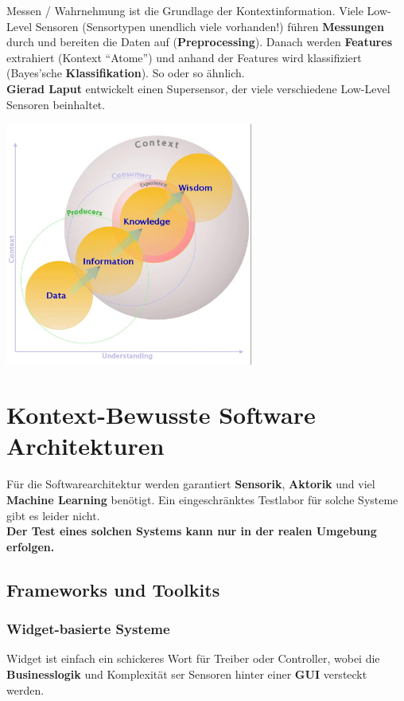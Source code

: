 \documentclass[a4paper]{article}
\begin{document}
Messen / Wahrnehmung ist die Grundlage der Kontextinformation. Viele Low-Level Sensoren (Sensortypen unendlich viele vorhanden!) führen \textbf{Messungen} durch und bereiten die Daten auf (\textbf{Preprocessing}). Danach werden \textbf{Features} extrahiert (Kontext ``Atome'') und anhand der Features wird klassifiziert (Bayes'sche \textbf{Klassifikation}). So oder so ähnlich.\\

\textbf{Gierad Laput} entwickelt einen Supersensor, der viele verschiedene Low-Level Sensoren beinhaltet. \\

\begin{center}
	\includegraphics[height = 8cm]{Kontext.png}
\end{center}
\newpage

\section{Kontext-Bewusste Software Architekturen}
Für die Softwarearchitektur werden garantiert \textbf{Sensorik}, \textbf{Aktorik} und viel \textbf{Machine Learning} benötigt. Ein eingeschränktes Testlabor für solche Systeme gibt es leider nicht.\\

\textbf{Der Test eines solchen Systems kann nur in der realen Umgebung erfolgen.}
\subsection{Frameworks und Toolkits}
\subsubsection{Widget-basierte Systeme}
Widget ist einfach ein schickeres Wort für Treiber oder Controller, wobei die \textbf{Businesslogik} und Komplexität ser Sensoren hinter einer \textbf{GUI} versteckt werden.
\end{document}
